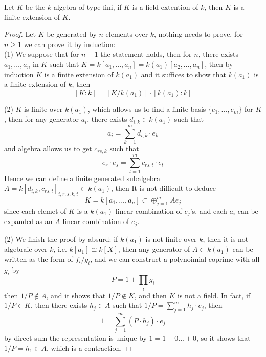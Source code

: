 \begin{theorem}
    Let \(K\) be the \(k\)-algebra of type fini, if \(K\) is a field extention of \(k\), then \(K\) is a finite extension of \(K\).
 \end{theorem}
\begin{proof}
    Let \(K\) be generated by \(n\) elements over \(k\), nothing needs to prove, for \(n \geq 1\) we can prove it by induction:\\

    (1) We suppose that for \(n-1\) the statement holds, then for \(n\), there exists \(a_1,\dots,a_n\) in \(K\) such that \(K= k[a_1,...,a_n] = k(a_1)[a_2,...,a_n]\), then by induction \(K\) is a finite extension of \(k(a_1)\) and it suffices to show that \(k(a_1)\) is a finite extension of \(k\), then
    \[[K:k] = [K/k(a_1)] \cdot [k(a_1):k]\]

    (2) \(K\) is finite over \(k(a_1)\), which allows us to find a finite basis \(\{e_1,...,e_m\}\) for \(K\), then for any generator \(a_i\), there exists \(d_{i,k} \in k(a_1)\) such that
    \[a_i  = \sum_{k=1}^{m}d_{i,k}\cdot e_k\]
    and algebra allows us to get \(c_{rs,k}\) such that
    \[e_r \cdot e_s = \sum_{t=1}^m c_{rs,t} \cdot e_t\]
    Hence we can define a finite generated subalgebra \(A = k[d_{i,k},c_{rs,t}]_{i,r,s,k,t} \subset k(a_1)\), then It is not difficult to deduce
    \[K = k[a_1,...,a_n] \subset \oplus_{j=1}^m Ae_j\]
    since each elemet of \(K\) is a \(k(a_1)\)-linear combination of \(e_j\)'s, and each \(a_i\) can be expanded as an \(A\)-linear combination of \(e_j\).

    (2) We finish the proof by absurd: if \(k(a_1)\) is not finite over \(k\), then it is not algebraic over \(k\), i.e. \(k[a_1] \cong k[X]\), then any generator of \(A \subset k(a_1)\) can be written as the form of \(f_i/g_i\), and we can construct a polynoimial coprime with all \(g_i\) by
    \[P = 1 + \prod_{i}g_i\]
    then \(1/P \notin A\), and it shows that \(1/P \notin K\), and then \(K\) is not a field. In fact, if \(1/P \in K\), then there exists \(h_j \in A\) such that \(1/P = \sum_{j=1}^{m}h_j \cdot e_j\), then
    \[1 = \sum_{j=1}^m (P \cdot h_j) \cdot e_j\]
    by direct sum the representation is unique by \(1 = 1+0...+0\), so it shows that \(1/P = h_1 \in A\), which is a contraction.
    
\end{proof}


